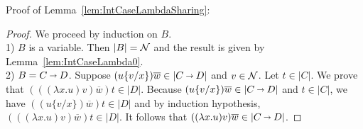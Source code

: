 \documentclass[orivec]{llncs}
\newif\ifnonotes\nonotesfalse
\newcommand{\Comment}[1]{\ifnonotes\else{\color{red}    \noindent{\bf Comment: }#1}\fi}
\begin{document}
Proof of Lemma~\ref{lem:IntCaseLambdaSharing}:

\begin{proof}
 We proceed by induction on $B$.
\\
1) $B$ is a variable. Then $|B| = \mathcal{N}$ and the result is given by Lemma~\ref{lem:IntCaseLambda0}.
\\
2) $B= C\vlim D$.
Suppose $(u\{v/x\})\overline{w} \in |C\vlim D|$ and $v\in\mathcal{N}$. Let $t\in|C|$. We prove that  $(((\lambda x.u) v)\overline{w})t \in |D|$. Because $(u\{v/x\})\overline{w} \in |C\vlim D|$ and $t\in|C|$, we have $((u\{v/x\})\overline{w})t \in |D|$ and by induction hypothesis, $(((\lambda x.u) v)\overline{w})t \in |D|$. It follows that $((\lambda x.u) v)\overline{w} \in |C\vlim D|$.
\end{proof}
%
%
%
%
%
%
%
%
%
%
\end{document}
